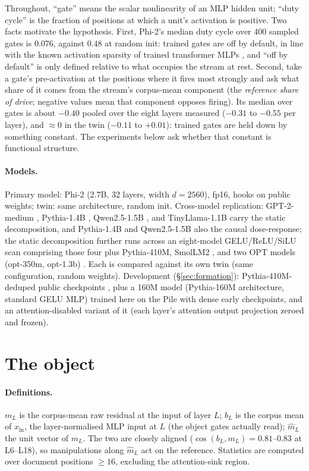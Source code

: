 \documentclass[11pt]{article}
\newcommand{\bl}{b_L}
\newcommand{\mhat}{\hat{m}}
\begin{document}
Throughout, ``gate'' means the scalar nonlinearity of an MLP hidden
unit; ``duty cycle'' is the fraction of positions at which a unit's
activation is positive. Two facts motivate the hypothesis.
First, Phi-2's median duty cycle over 400 sampled gates is 0.076, against
0.48 at random init: trained gates are off by default, in line with the
known activation sparsity of trained transformer MLPs
\citep{li2023lazy,szatkowski2025},
and ``off by default'' is only defined relative to what occupies the
stream at rest. Second, take a gate's pre-activation at the positions where it fires
most strongly and ask what share of it comes from the stream's
corpus-mean component (the \emph{reference share of drive}; negative
values mean that component opposes firing). Its median over gates is
about $-0.40$ pooled over the eight layers measured ($-0.31$ to $-0.55$
per layer), and $\approx 0$ in the twin ($-0.11$ to $+0.01$): trained
gates are held down by something constant. The experiments below ask
whether that constant is functional structure.

\paragraph{Models.} Primary model: Phi-2 \citep{abdin2023phi} (2.7B, 32
layers, width $d{=}2560$), fp16, hooks on public weights; twin: same
architecture, random init. Cross-model replication:
GPT-2-medium \citep{radford2019gpt2}, Pythia-1.4B \citep{biderman2023},
Qwen2.5-1.5B \citep{qwen2024}, and TinyLlama-1.1B
\citep{zhang2024tinyllama} carry the static decomposition, and
Pythia-1.4B and Qwen2.5-1.5B also the causal dose-response; the static
decomposition further runs across an eight-model GELU/ReLU/SiLU scan
comprising those four plus Pythia-410M, SmolLM2 \citep{allal2025smollm},
and two OPT models (opt-350m, opt-1.3b) \citep{zhang2022opt}. Each is compared against its own
twin (same configuration, random weights). Development (\S\ref{sec:formation}):
Pythia-410M-deduped public checkpoints \citep{biderman2023}, plus a
160M model (Pythia-160M architecture, standard GELU MLP) trained here on
the Pile with dense early checkpoints, and an attention-disabled variant
of it (each layer's attention output projection zeroed and frozen).

\section{The object}
\label{sec:object}

\paragraph{Definitions.} $m_L$ is the corpus-mean raw residual at the
input of layer $L$; $\bl$ is the corpus mean of $x_{\text{ln}}$, the
layer-normalised MLP input at $L$ (the object gates actually read); $\mhat_L$ the unit
vector of $m_L$. The two are closely aligned ($\cos(\bl, m_L) =
0.81$--$0.83$ at L6--L18), so manipulations along $\mhat_L$ act on the
reference. Statistics are computed over document positions
$\geq 16$, excluding the attention-sink region.
\end{document}
